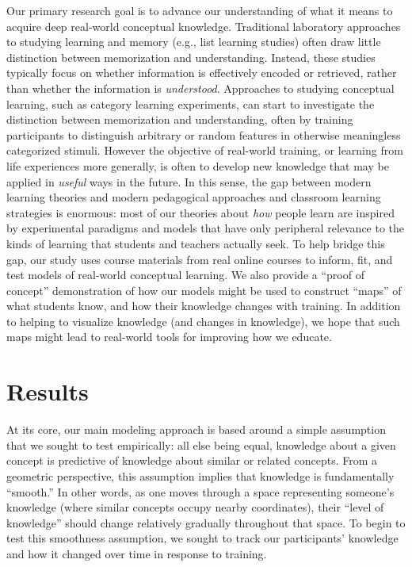 \documentclass[10pt]{article}
\begin{document}
Our primary research goal is to advance our understanding of what it means to
acquire deep real-world conceptual knowledge. Traditional laboratory approaches
to studying learning and memory (e.g., list learning studies) often draw little
distinction between memorization and understanding. Instead, these studies
typically focus on whether information is effectively encoded or retrieved,
rather than whether the information is \textit{understood}. Approaches to
studying conceptual learning, such as category learning experiments, can start
to investigate the distinction between memorization and understanding, often by
training participants to distinguish arbitrary or random features in otherwise
meaningless categorized stimuli. However the objective of real-world training,
or learning from life experiences more generally, is often to develop new
knowledge that may be applied in \textit{useful} ways in the future. In this
sense, the gap between modern learning theories and modern pedagogical
approaches and classroom learning strategies is enormous: most of our theories
about \textit{how} people learn are inspired by experimental paradigms and
models that have only peripheral relevance to the kinds of learning that
students and teachers actually seek. To help bridge this gap, our study uses
course materials from real online courses to inform, fit, and test models of
real-world conceptual learning. We also provide a ``proof of concept''
demonstration of how our models might be used to construct ``maps'' of what
students know, and how their knowledge changes with training. In addition to
helping to visualize knowledge (and changes in knowledge), we hope that such
maps might lead to real-world tools for improving how we educate.

\section*{Results}

At its core, our main modeling approach is based around a simple assumption
that we sought to test empirically: all else being equal, knowledge about a
given concept is predictive of knowledge about similar or related concepts.
From a geometric perspective, this assumption implies that knowledge is
fundamentally ``smooth.'' In other words, as one moves through a space
representing someone's knowledge (where similar concepts occupy nearby
coordinates), their ``level of knowledge'' should change relatively gradually
throughout that space. To begin to test this smoothness assumption, we sought
to track our participants' knowledge and how it changed over time in response
to training.
\end{document}
